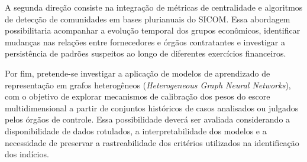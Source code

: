 A segunda direção consiste na integração de métricas de centralidade e algoritmos de detecção de comunidades em bases plurianuais do SICOM. Essa abordagem possibilitaria acompanhar a evolução temporal dos grupos econômicos, identificar mudanças nas relações entre fornecedores e órgãos contratantes e investigar a persistência de padrões suspeitos ao longo de diferentes exercícios financeiros.

Por fim, pretende-se investigar a aplicação de modelos de aprendizado de representação em grafos heterogêneos (\textit{Heterogeneous Graph Neural Networks}), com o objetivo de explorar mecanismos de calibração dos pesos do escore multidimensional a partir de conjuntos históricos de casos analisados ou julgados pelos órgãos de controle. Essa possibilidade deverá ser avaliada considerando a disponibilidade de dados rotulados, a interpretabilidade dos modelos e a necessidade de preservar a rastreabilidade dos critérios utilizados na identificação dos indícios.
